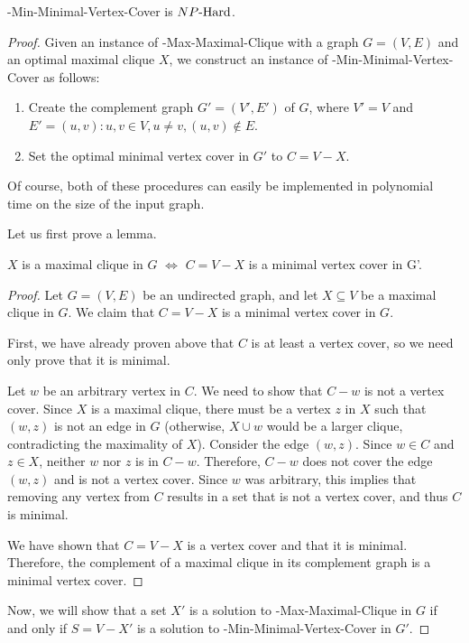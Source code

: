 \begin{theorem}
\exob{}-Min-Minimal-Vertex-Cover is ${NP\text{-Hard{}}}$.
\end{theorem}
\begin{proof}
Given an instance of \exob{}-Max-Maximal-Clique with a graph $G = (V, E)$ and an optimal maximal clique $X$, we construct an instance of \exob{}-Min-Minimal-Vertex-Cover as follows:

\begin{enumerate}
    \item  Create the complement graph $G' = (V', E')$ of $G$, where $V' = V$ and $E' = {(u, v) : u, v \in V, u \neq v, (u, v) \notin E}$.
    \item Set the optimal minimal vertex cover in $G'$ to $C = V - X$.
\end{enumerate}
Of course, both of these procedures can easily be implemented in polynomial time on the size of the input graph. 

Let us first prove a lemma.
\begin{lemma*}
    $X$ is a maximal clique in $G$ $\iff$ $C = V - X$ is a minimal vertex cover in G'.
\end{lemma*}
\begin{proof}
Let $G = (V, E)$ be an undirected graph, and let $X \subseteq V$ be a maximal clique in $G$. We claim that $C = V - X$ is a minimal vertex cover in $G$.

First, we have already proven above that $C$ is at least a vertex cover, so we need only prove that it is minimal. 

 Let $w$ be an arbitrary vertex in $C$. We need to show that $C - {w}$ is not a vertex cover. Since $X$ is a maximal clique, there must be a vertex $z$ in $X$ such that $(w, z)$ is not an edge in $G$ (otherwise, $X \cup {w}$ would be a larger clique, contradicting the maximality of $X$). Consider the edge $(w, z)$. Since $w \in C$ and $z \in X$, neither $w$ nor $z$ is in $C - {w}$. Therefore, $C - {w}$ does not cover the edge $(w, z)$ and is not a vertex cover. Since $w$ was arbitrary, this implies that removing any vertex from $C$ results in a set that is not a vertex cover, and thus $C$ is minimal.

We have shown that $C = V - X$ is a vertex cover and that it is minimal. Therefore, the complement of a maximal clique in its complement graph is a minimal vertex cover.
\end{proof}
Now, we will show that a set $X'$ is a solution to \exob{}-Max-Maximal-Clique in $G$ if and only if $S = V - X'$ is a solution to \exob{}-Min-Minimal-Vertex-Cover in $G'$.


\end{proof}
